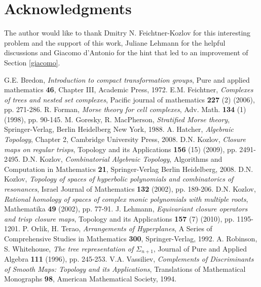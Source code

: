 \documentclass{elsarticle}
\begin{document}
\section*{Acknowledgments}
The author would like to thank Dmitry N. Feichtner-Kozlov for this interesting problem and the support of this work, Juliane Lehmann for the helpful discussions and Giacomo d'Antonio for the hint that led to an improvement of Section \ref{giacomo}.

\begin{thebibliography}{00}
G.E. Bredon, \textit{Introduction to compact transformation groups}, Pure and applied mathematics \textbf{46}, Chapter III, Academic Press, 1972.
E.M. Feichtner, \textit{Complexes of trees and nested set complexes}, Pacific journal of mathematics \textbf{227} (2) (2006), pp. 271-286.
R. Forman, \textit{Morse theory for cell complexes}, Adv. Math. \textbf{134} (1) (1998), pp. 90-145.
M. Goresky, R. MacPherson, \textit{Stratified Morse theory}, Springer-Verlag, Berlin Heidelberg New York, 1988.
A. Hatcher, \textit{Algebraic Topology}, Chapter 2, Cambridge University Press, 2008.
D.N. Kozlov, \textit{Closure maps on regular trisps}, Topology and its Applications \textbf{156} (15) (2009), pp. 2491-2495.
D.N. Kozlov, \textit{Combinatorial Algebraic Topology}, Algorithms and Computation in Mathematics \textbf{21}, Springer-Verlag Berlin Heidelberg, 2008.
D.N. Kozlov, \textit{Topology of spaces of hyperbolic polynomials and combinatorics of resonances}, Israel Journal of Mathematics \textbf{132} (2002), pp. 189-206.
D.N. Kozlov, \textit{Rational homology of spaces of complex monic polynomials with multiple roots}, Mathematika  \textbf{49} (2002), pp. 77-91.
J. Lehmann, \textit{Equivariant closure operators and trisp closure maps}, Topology and its Applications \textbf{157} (7) (2010), pp. 1195-1201.
P. Orlik, H. Terao, \textit{Arrangements of Hyperplanes}, A Series of Comprehensive Studies in Mathematics \textbf{300}, Springer-Verlag, 1992.
A. Robinson, S. Whitehouse, \textit{The tree representation of $\Sigma_{n+1}$}, Journal of Pure and Applied Algebra \textbf{111} (1996), pp. 245-253.
V.A. Vassiliev, \textit{Complements of Discriminants of Smooth Maps: Topology and its Applications}, Translations of Mathematical Monographs \textbf{98}, American Mathematical Society, 1994.
\end{thebibliography}
\end{document}
